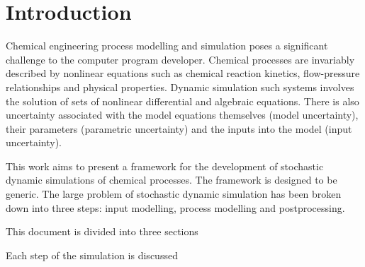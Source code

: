 \chapter{Introduction}\label{chap:intro}

Chemical engineering process modelling and simulation poses a
significant challenge to the computer program developer.  Chemical
processes are invariably described by nonlinear equations such as
chemical reaction kinetics, flow-pressure relationships and physical
properties.  Dynamic simulation such systems involves the solution of
sets of nonlinear differential and algebraic equations.  There is also
uncertainty associated with the model equations themselves (model
uncertainty), their parameters (parametric uncertainty) and the inputs
into the model (input uncertainty).

This work aims to present a framework for the development of
stochastic dynamic simulations of chemical processes.  The framework
is designed to be generic.  The large problem of stochastic dynamic
simulation has been broken down into three steps: input modelling,
process modelling and postprocessing.  

This document is divided into three sections

Each step of the simulation is
discussed


